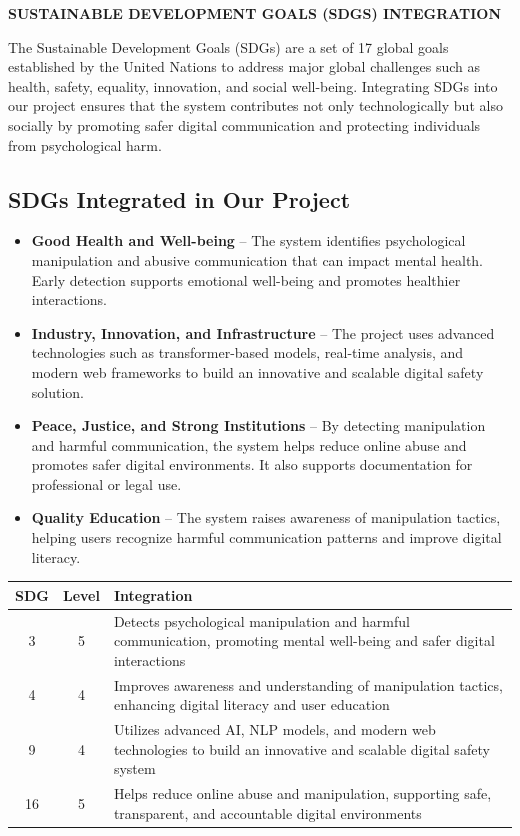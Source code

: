 \documentclass[a4paper,12pt]{report}
\begin{document}
\begin{center}
    \textbf{\large SUSTAINABLE DEVELOPMENT GOALS (SDGS) INTEGRATION} 
\end{center}

The Sustainable Development Goals (SDGs) are a set of 17 global goals established by the United Nations to address major global challenges such as health, safety, equality, innovation, and social well-being. Integrating SDGs into our project ensures that the system contributes not only technologically but also socially by promoting safer digital communication and protecting individuals from psychological harm.

\subsection*{SDGs Integrated in Our Project}
\begin{itemize}[leftmargin=2.5cm]
    \item[\textbf{SDG 3:}] \textbf{Good Health and Well-being} -- The system identifies psychological manipulation and abusive communication that can impact mental health. Early detection supports emotional well-being and promotes healthier interactions.
    \item[\textbf{SDG 9:}] \textbf{Industry, Innovation, and Infrastructure} -- The project uses advanced technologies such as transformer-based models, real-time analysis, and modern web frameworks to build an innovative and scalable digital safety solution.
    \item[\textbf{SDG 16:}] \textbf{Peace, Justice, and Strong Institutions} -- By detecting manipulation and harmful communication, the system helps reduce online abuse and promotes safer digital environments. It also supports documentation for professional or legal use.
    \item[\textbf{SDG 4:}] \textbf{Quality Education} -- The system raises awareness of manipulation tactics, helping users recognize harmful communication patterns and improve digital literacy.
\end{itemize}

\begin{table}[h]
\centering
\renewcommand{\arraystretch}{1.3}
\begin{tabular}{|c|c|p{11cm}|}
\hline
\textbf{SDG} & \textbf{Level} & \textbf{Integration} \\
\hline
3 & 5 & Detects psychological manipulation and harmful communication, promoting mental well-being and safer digital interactions \\
\hline
4 & 4 & Improves awareness and understanding of manipulation tactics, enhancing digital literacy and user education \\
\hline
9 & 4 & Utilizes advanced AI, NLP models, and modern web technologies to build an innovative and scalable digital safety system \\
\hline
16 & 5 & Helps reduce online abuse and manipulation, supporting safe, transparent, and accountable digital environments \\
\hline
\end{tabular}
\end{table}
\newpage
\end{document}
